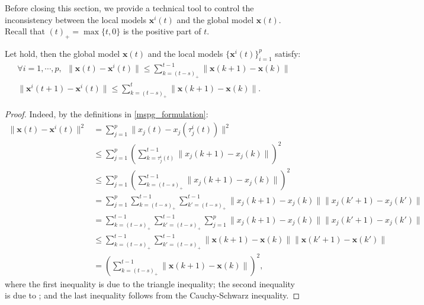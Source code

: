 \documentclass[leqno,onefignum,onetabnum]{siamart0516}
\newcommand{\xb}{\mathbf{x}}
\newcommand{\dind}{k}
\begin{document}
Before closing this section, we provide a technical tool to control the inconsistency between the local models $\xb^i(t)$ and the global model $\xb(t)$. 
Recall that $(t)_+ = \max\{t, 0\}$ is the positive part of $t$.
\begin{lemma}
\label{thm:incon}
Let  hold, then the global model $\xb(t)$ and the local models $\{\xb^i(t)\}_{i=1}^p$ satisfy:
\begin{align}
\forall i=1,\cdots,p, ~~ \|\xb(t) - \xb^i(t)\| \leq \sum_{\dind = (t-s)_+}^{t-1} \| \xb(\dind+1) -  \xb(\dind) \| \label{incon_bound}
\\
\label{eq:local_diff}
\|\xb^i(t+1) - \xb^i(t)\| \leq \sum_{\dind = (t-s)_+}^{t} \| \xb(\dind+1) -  \xb(\dind) \|. 
\end{align}
\end{lemma}
\begin{proof}
 	Indeed, by the definitions in \eqref{mspg_formulation}:
 	\begin{align*}
 	\|\xb(t) - \xb^i(t)\|^2 &= \sum_{j=1}^p \|x_j(t) -  x_j(\tau_j^i(t)) \|^2
 	\\
 	 &\leq 
 	\sum_{j=1}^p \left(\sum_{\dind = \tau_j^i(t)}^{t-1} \|x_j(\dind+1) -  x_j(\dind) \|\right)^2
 	\\
 	&{\leq} 
 	\sum_{j=1}^p \left(\sum_{\dind = (t-s)_+}^{t-1} \|x_j(\dind+1) -  x_j(\dind) \|\right)^2
 	\\
 	&=\sum_{j=1}^p \sum_{\dind = (t-s)_+}^{t-1} \sum_{\dind' = (t-s)_+}^{t-1} \|x_j(\dind+1) -  x_j(\dind) \|\|x_j(\dind'+1) -  x_j(\dind') \|
 	\\
&=\sum_{\dind = (t-s)_+}^{t-1} \sum_{\dind' = (t-s)_+}^{t-1} \sum_{j=1}^p \|x_j(\dind+1) -  x_j(\dind) \|\|x_j(\dind'+1) -  x_j(\dind') \| 	
 	\\
&{\leq}\sum_{\dind = (t-s)_+}^{t-1} \sum_{\dind' = (t-s)_+}^{t-1} \|\xb(\dind+1) -  \xb(\dind) \|\|\xb(\dind'+1) -  \xb(\dind') \| 	
 	\\
 	&=
 	\left(\sum_{\dind = (t-s)_+}^{t-1} \| \xb(\dind+1) -  \xb(\dind) \|\right)^2,
 	\end{align*}
 	where the first inequality is due to the triangle inequality; the second inequality is due to ; and the last inequality follows from the Cauchy-Schwarz inequality.
	

\end{proof}
\end{document}
